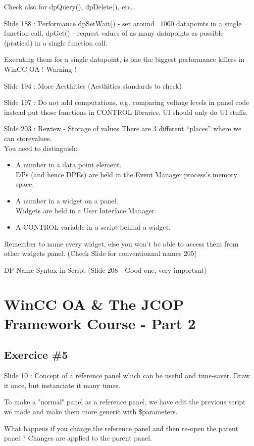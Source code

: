 \documentclass[a4paper, 10pt]{article}
\begin{document}
Check also for dpQuery(), dpDelete(), etc\dots

Slide 188 : Performance
dpSetWait() - set around ~1000 datapoints in a single function call.
dpGet() - request values of as many datapoints as possible (pratical) in a single function call.

Executing them for a single datapoint, is one the biggest performance killers in WinCC OA ! Warning !

Slide 194 : More Aesthitics (Aesthitics standards to check)

Slide 197 : Do not add computations, e.g. comparing voltage levels in panel code instead put those functions in CONTROL libraries. UI should only do UI stuffs.

Slide 203 : Rewiew - Storage of values
There are 3 different “places” where we can storevalues.\\
You need to distinguish:
\begin{itemize}
    \item A number in a data point element.\\
DPs (and hence DPEs) are held in the Event Manager process’s memory space.
    \item A number in a widget on a panel.\\
Widgets are held in a User Interface Manager.
    \item A CONTROL variable in a script behind a widget.
\end{itemize}

Remember to name every widget, else you won't be able to access them from other widgets panel.
(Check Slide for conventionnal names 205)

DP Name Syntax in Script (Slide 208 - Good one, very important)

\section{WinCC OA \&  The JCOP Framework Course - Part 2}
\subsection{Exercice \#5}
Slide 10 : Concept of a reference panel which can be useful and time-saver.
Draw it once, but instanciate it many times.

To make a "normal" panel as a reference panel, we have edit the previous script we made and make them more generic with \$parameters.

What happens if you change the reference panel and then re-open the parent panel ?
Changes are applied to the parent panel.
\end{document}
